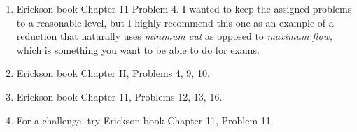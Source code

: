 \documentclass[11pt]{article}
\theoremstyle{definition}
\begin{document}
\begin{enumerate}[leftmargin=0pt]
\begin{enumerate}[leftmargin=0pt]
\item Erickson book Chapter 11 Problem 4.  {\color{red} I wanted to keep the assigned problems to a reasonable level, but I highly recommend this one as an example of a reduction that naturally uses \emph{minimum cut} as opposed to \emph{maximum flow}, which is something you want to be able to do for exams.}

\item Erickson book Chapter H, Problems 4, 9, 10.

\item Erickson book Chapter 11, Problems 12, 13, 16.

\item For a challenge, try Erickson book Chapter 11, Problem 11.
\end{enumerate}

\end{enumerate}
\end{document}

